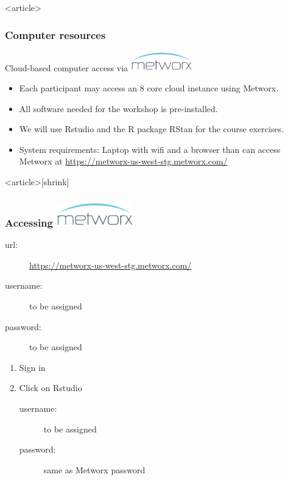 \documentclass[handout]{beamer}
\begin{document}
\begin{frame}<article>
  \frametitle{Computer resources}

Cloud-based computer access via \href{http://metrumrg.com/solution/metworx/}{\includegraphics[width=0.2\textwidth]{graphics/metworx.pdf}} 
\begin{itemize}
\item Each participant may access an 8 core cloud instance using
  Metworx.
\item All software needed for the workshop is pre-installed.
\item We will use Rstudio and the R package RStan for the course
  exercises.
\item System requirements: Laptop with wifi and a browser than can
  access Metworx at \url{https://metworx-us-west-stg.metworx.com/}
\end{itemize}
  
\end{frame}

\begin{frame}<article>[shrink]
  \frametitle{Accessing \href{https://www.metrumrg.com/solution/metworx/}{\includegraphics[width=0.25\textwidth]{graphics/metworx.pdf}} }
  
  \begin{description}
  \item[url:] \url{https://metworx-us-west-stg.metworx.com/}
\item[username:] to be assigned
\item[password:] to be assigned
  \end{description}
  \begin{enumerate}
  \item Sign in
\item Click on Rstudio 
  \begin{description}
  \item[username:] to be assigned
\item[password:] same as Metworx password
   \end{description}
  \end{enumerate}

\end{frame}
\end{document}
